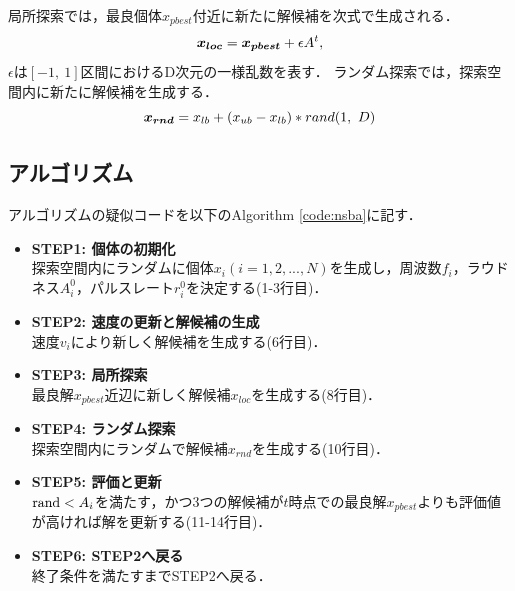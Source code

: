 \documentclass[a4j,11pt]{jarticle}
\begin{document}
局所探索では，最良個体$x_{pbest}$付近に新たに解候補を次式で生成される．
\begin{equation}
\mbox{\boldmath $x_{loc}$}=\mbox{\boldmath $x_{pbest}$} + \epsilon A^t,
\label{eq:ns_xloc}
\end{equation}
$\epsilon$は$[-1, \ 1]$区間におけるD次元の一様乱数を表す．
ランダム探索では，探索空間内に新たに解候補を生成する．
\begin{equation}
\mbox{\boldmath $x_{rnd}$} = x_{lb} + (x_{ub} - x_{lb})* rand(1, \ D)
\label{eq:ns_rnd}
\end{equation}

\subsection{アルゴリズム}
\label{ss:NSBA-algorithm}
アルゴリズムの疑似コードを以下のAlgorithm \ref{code:nsba}に記す．

\begin{itemize}
\item {\bf STEP1: 個体の初期化}\\
探索空間内にランダムに個体$x_i (i=1,2,...,N)$を生成し，周波数$f_i$，ラウドネス$A_i^0$，パルスレート$r_i^0$を決定する(1-3行目)．
\item {\bf STEP2: 速度の更新と解候補の生成}\\
速度$v_i$により新しく解候補を生成する(6行目)．
\item {\bf STEP3: 局所探索}\\
最良解$x_{pbest}$近辺に新しく解候補$x_{loc}$を生成する(8行目)．
\item {\bf STEP4: ランダム探索}\\
探索空間内にランダムで解候補$x_{rnd}$を生成する(10行目)．
\item {\bf STEP5: 評価と更新}\\
${\rm rand} < A_i$を満たす，かつ3つの解候補が$t$時点での最良解$x_{pbest}$よりも評価値が高ければ解を更新する(11-14行目)．
\item {\bf STEP6: STEP2へ戻る}\\
終了条件を満たすまでSTEP2へ戻る．
\end{itemize}
\end{document}
